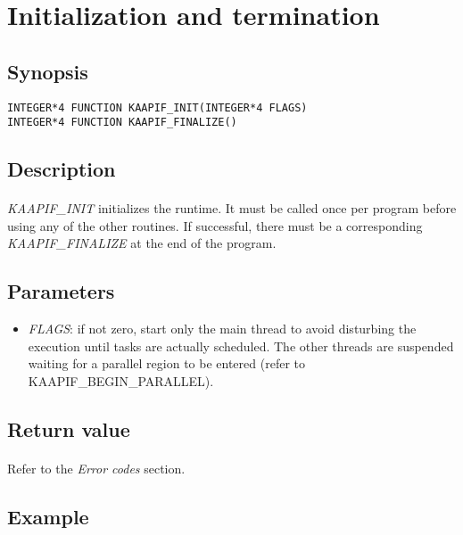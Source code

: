 \documentclass[a4paper, 11pt]{article}
\begin{document}
\newpage
\section{Initialization and termination}

\subsection{Synopsis}
\begin{small}
\lstset{language=C}
\begin{lstlisting}[frame=tb]
INTEGER*4 FUNCTION KAAPIF_INIT(INTEGER*4 FLAGS)
INTEGER*4 FUNCTION KAAPIF_FINALIZE()
\end{lstlisting}
\end{small}

\subsection{Description}
\paragraph{}
\textit{KAAPIF\_INIT} initializes the runtime. It must be called once per program
before using any of the other routines. If successful, there must be a
corresponding \textit{KAAPIF\_FINALIZE} at the end of the program.

\subsection{Parameters}
\begin{itemize}
\item \textit{FLAGS}: if not zero, start only the main thread to avoid disturbing
the execution until tasks are actually scheduled. The other threads are suspended
waiting for a parallel region to be entered (refer to KAAPIF\_BEGIN\_PARALLEL).
\end{itemize}

\subsection{Return value}
\paragraph{}
Refer to the \textit{Error codes} section.

\subsection{Example}
\end{document}
